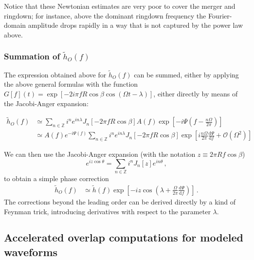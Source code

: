 \documentclass[aps,showpacs,%
prd,superscriptaddress,nofootinbib]{revtex4}
\newcommand{\be}{\begin{equation}}
\newcommand{\ee}{\end{equation}}
\newcommand\ud{{\mathrm{d}}}
\newcommand\calO{{\mathcal{O}}}
\newcommand{\nn}{\nonumber}
\begin{document}
Notice that these Newtonian estimates are very poor to cover the merger and ringdown; for instance, above the dominant ringdown frequency the Fourier-domain amplitude drops rapidly in a way that is not captured by the power law above.


\subsubsection*{Summation of $\tilde{h}_{O}\left(f\right)$}

The expression obtained above for $\tilde{h}_{O}\left(f\right)$ can be summed, either by applying the above general formulas with the function $G[f](t) = \exp\left[ -2i \pi f R \cos \beta \cos (\Omega t - \lambda) \right]$, either directly by means of the Jacobi-Anger expansion:
%
\begin{widetext}
\begin{align}
	\tilde{h}_{O}\left(f\right) &\simeq \sum\limits_{n\in \mathbb{Z}} i^{n}e^{i n \lambda} J_{n}\left[ -2\pi f R \cos \beta \right] A(f) \exp\left[ -i \Psi \left(f-\frac{n\Omega}{2\pi}\right) \right] \nn \\
	&\simeq A(f) e^{-i \Psi \left(f\right)} \sum\limits_{n\in \mathbb{Z}} i^{n}e^{i n \lambda} J_{n}\left[ -2\pi f R \cos \beta \right] \exp\left[ i \frac{n\Omega}{2\pi} \frac{\ud \Psi}{\ud f} + \calO(\Omega^{2})  \right]
\end{align}
\end{widetext}
%
We can then use the Jacobi-Anger expansion (with the notation $z\equiv 2\pi R f \cos\beta$)
%
\be
	e^{i z \cos \theta}= \sum\limits_{n\in \mathbb{Z}} i^{n}J_{n}[z]e^{i n \theta} \,,
\ee
%
to obtain a simple phase correction
%
\begin{subequations}
\begin{align}
	\tilde{h}_{O}\left(f\right) &\simeq \tilde{h}(f) \exp\left[ -iz \cos\left( \lambda + \frac{\Omega}{2\pi} \frac{\ud \Psi}{\ud f} \right) \right]\,.
\end{align}
\end{subequations}
%
The corrections beyond the leading order can be derived directly by a kind of Feynman trick, introducing derivatives with respect to the parameter $\lambda$.


\subsection{Accelerated overlap computations for modeled waveforms}
\label{subsec:overlaps}
\end{document}
